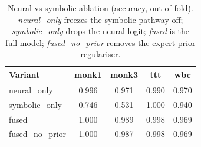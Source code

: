 \begin{table}[t]\centering
\small
\caption{Neural-vs-symbolic ablation (accuracy, out-of-fold). \emph{neural\_only} freezes the symbolic pathway off; \emph{symbolic\_only} drops the neural logit; \emph{fused} is the full model; \emph{fused\_no\_prior} removes the expert-prior regulariser.}
\label{tab:ablation}
\begin{tabular}{lcccc}
\toprule
Variant & monk1 & monk3 & ttt & wbc \\
\midrule
neural\_only & 0.996 & 0.971 & 0.990 & 0.970 \\
symbolic\_only & 0.746 & 0.531 & 1.000 & 0.940 \\
fused & 1.000 & 0.989 & 0.998 & 0.969 \\
fused\_no\_prior & 1.000 & 0.987 & 0.998 & 0.969 \\
\bottomrule
\end{tabular}
\end{table}
